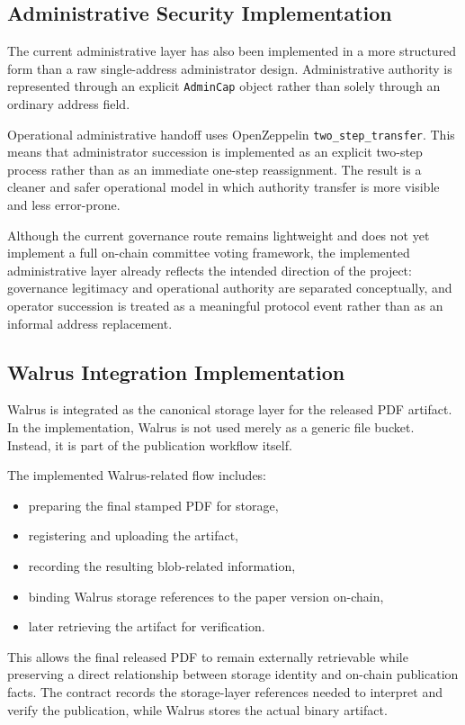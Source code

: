 \documentclass[journal]{IEEEtran}
\begin{document}
\subsection{Administrative Security Implementation}

The current administrative layer has also been implemented in a more structured form than a raw single-address administrator design. Administrative authority is represented through an explicit \texttt{AdminCap} object rather than solely through an ordinary address field.

Operational administrative handoff uses OpenZeppelin \texttt{two\_step\_transfer}. This means that administrator succession is implemented as an explicit two-step process rather than as an immediate one-step reassignment. The result is a cleaner and safer operational model in which authority transfer is more visible and less error-prone.

Although the current governance route remains lightweight and does not yet implement a full on-chain committee voting framework, the implemented administrative layer already reflects the intended direction of the project: governance legitimacy and operational authority are separated conceptually, and operator succession is treated as a meaningful protocol event rather than as an informal address replacement.

\subsection{Walrus Integration Implementation}

Walrus is integrated as the canonical storage layer for the released PDF artifact. In the implementation, Walrus is not used merely as a generic file bucket. Instead, it is part of the publication workflow itself.

The implemented Walrus-related flow includes:
\begin{itemize}
    \item preparing the final stamped PDF for storage,
    \item registering and uploading the artifact,
    \item recording the resulting blob-related information,
    \item binding Walrus storage references to the paper version on-chain,
    \item later retrieving the artifact for verification.
\end{itemize}


This allows the final released PDF to remain externally retrievable while preserving a direct relationship between storage identity and on-chain publication facts. The contract records the storage-layer references needed to interpret and verify the publication, while Walrus stores the actual binary artifact.
\end{document}
